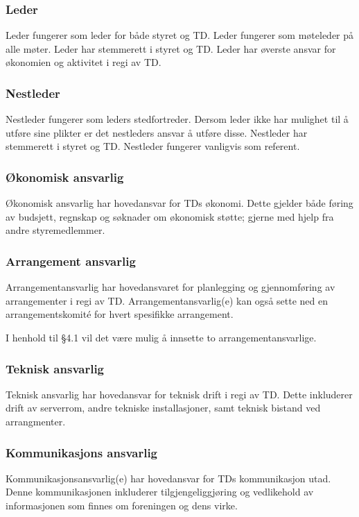 \documentclass[11pt]{article}
\begin{document}
\subsubsection{Leder}
Leder fungerer som leder for både styret og TD. Leder fungerer som møteleder på alle møter. Leder har stemmerett i styret og TD. Leder har øverste ansvar for økonomien og aktivitet i regi av TD.

\subsubsection{Nestleder}
Nestleder fungerer som leders stedfortreder. Dersom leder ikke har mulighet til å utføre sine plikter er det nestleders ansvar å utføre disse. Nestleder har stemmerett i styret og TD. Nestleder fungerer vanligvis som referent.

\subsubsection{Økonomisk ansvarlig}
Økonomisk ansvarlig har hovedansvar for TDs økonomi. Dette gjelder både føring av budsjett, regnskap og søknader om økonomisk støtte; gjerne med hjelp fra andre styremedlemmer.

\subsubsection{Arrangement ansvarlig}
Arrangementansvarlig har hovedansvaret for planlegging og gjennomføring av arrangementer i regi av TD. 
Arrangementansvarlig(e) kan også sette ned en arrangementskomité for hvert spesifikke arrangement.

I henhold til §4.1 vil det være mulig å innsette to arrangementansvarlige.

\subsubsection{Teknisk ansvarlig}
Teknisk ansvarlig har hovedansvar for teknisk drift i regi av TD. Dette inkluderer drift av serverrom, andre tekniske installasjoner, samt teknisk bistand ved arrangmenter.

\subsubsection{Kommunikasjons ansvarlig}
Kommunikasjonsansvarlig(e) har hovedansvar for TDs kommunikasjon utad. 
Denne kommunikasjonen inkluderer tilgjengeliggjøring og vedlikehold av informasjonen som finnes om foreningen og dens virke.
\end{document}
